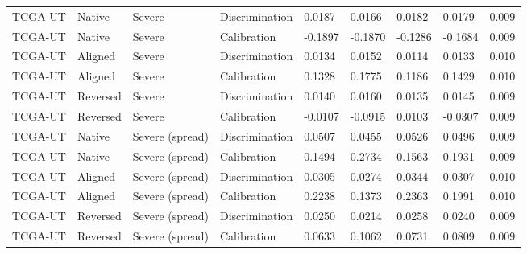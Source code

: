\begin{longtable}{lllllllll}
TCGA-UT & Native & Severe & Discrimination & 0.0187 & 0.0166 & 0.0182 & 0.0179 & 0.009 \\
TCGA-UT & Native & Severe & Calibration & -0.1897 & -0.1870 & -0.1286 & -0.1684 & 0.009 \\
TCGA-UT & Aligned & Severe & Discrimination & 0.0134 & 0.0152 & 0.0114 & 0.0133 & 0.010 \\
TCGA-UT & Aligned & Severe & Calibration & 0.1328 & 0.1775 & 0.1186 & 0.1429 & 0.010 \\
TCGA-UT & Reversed & Severe & Discrimination & 0.0140 & 0.0160 & 0.0135 & 0.0145 & 0.009 \\
TCGA-UT & Reversed & Severe & Calibration & -0.0107 & -0.0915 & 0.0103 & -0.0307 & 0.009 \\
TCGA-UT & Native & Severe (spread) & Discrimination & 0.0507 & 0.0455 & 0.0526 & 0.0496 & 0.009 \\
TCGA-UT & Native & Severe (spread) & Calibration & 0.1494 & 0.2734 & 0.1563 & 0.1931 & 0.009 \\
TCGA-UT & Aligned & Severe (spread) & Discrimination & 0.0305 & 0.0274 & 0.0344 & 0.0307 & 0.010 \\
TCGA-UT & Aligned & Severe (spread) & Calibration & 0.2238 & 0.1373 & 0.2363 & 0.1991 & 0.010 \\
TCGA-UT & Reversed & Severe (spread) & Discrimination & 0.0250 & 0.0214 & 0.0258 & 0.0240 & 0.009 \\
TCGA-UT & Reversed & Severe (spread) & Calibration & 0.0633 & 0.1062 & 0.0731 & 0.0809 & 0.009 \\
\end{longtable}
